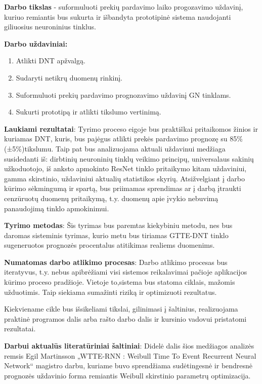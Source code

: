 \documentclass{VUMIFPSkursinis}
\begin{document}
\textbf{Darbo tikslas} - suformuluoti prekių pardavimo laiko progozavimo uždavinį, kuriuo remiantis bus sukurta ir išbandyta prototipinė sistema naudojanti giliuosius neuroninius tinklus.

\vspace{3mm} %

\textbf{Darbo uždaviniai:}
\begin{enumerate}
  \item Atlikti DNT apžvalgą.%
  \item Sudaryti netikrų duomenų rinkinį.
  \item Suformuluoti prekių pardavimo prognozavimo uždavinį GN tinklams.
  \item Sukurti prototipą ir atlikti tikslumo vertinimą.
\end{enumerate}

\textbf{Laukiami rezultatai}: Tyrimo proceso eigoje bus praktiškai pritaikomos žinios ir kuriamas DNT, kuris, bus pajėgus atlikti prekės pardavimo prognozę su 85\% (±5\%)tikslumu. Taip pat bus analizuojama aktuali uždavinui medžiaga susidedanti iš: dirbtinių neuroninių tinklų veikimo principų, universalaus sakinių užkoduotojo, iš anksto apmokinto ResNet tinklo pritaikymo kitam uždaviniui, gamma skirstinio, uždaviniui aktualių statistikos skyrių. Atsižvelgiant į darbo kūrimo sėkmingumą ir spartą, bus priimamas sprendimas ar į darbą įtraukti cenzūruotų duomenų pritaikymą, t.y. duomenų apie įvykio nebuvimą panaudojimą tinklo apmokinimui.

\textbf{Tyrimo metodas}: Šis tyrimas bus paremtas kiekybiniu metodu, nes bus daromas sisteminis tyrimas, kurio metu bus tiriamas GTTE-DNT tinklo sugeneruotos prognozės procentalus atitikimas realiems duomenims.

\textbf{Numatomas darbo atlikimo procesas}: Darbo atlikimo procesas bus iteratyvus, t.y. nebus apibrėžiami visi sistemos reikalavimai pačioje aplikacijos kūrimo proceso pradžioje. Vietoje to,sistema bus statoma ciklais, mažomis užduotimis. Taip siekiama sumažinti riziką ir optimizuoti rezultatus.

Kiekviename cikle bus išsikeliami tikslai, gilinimasi į šaltinius, realizuojama praktinė programos dalis arba rašto darbo dalis ir kursinio vadovui pristatomi rezultatai.

\textbf{Darbui aktualūs literatūriniai šaltiniai}: Didelė dalis šios medžiagos analizės remsis Egil Martinsson „WTTE-RNN : Weibull Time To Event Recurrent Neural Network“ magistro darbu,  kuriame buvo sprendžiama sudėtingesnė ir bendresnė prognozės uždavinio forma remiantis Weibull skirstinio parametrų optimizacija.
\end{document}
